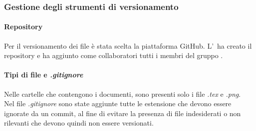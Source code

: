     \subsubsection{Gestione degli strumenti di versionamento}
      \paragraph{Repository}
        Per il versionamento dei file è stata scelta la piattaforma GitHub\glo. L'\roleAdministrator\ ha creato il repository e ha aggiunto 
        come collaboratori tutti i membri del gruppo \groupName.

      \paragraph{Tipi di file e \textit{.gitignore}}
        Nelle cartelle che contengono i documenti, sono presenti solo i file \textit{.tex} e \textit{.png}.\\
        Nel file \textit{.gitignore} sono state aggiunte tutte le estensione che devono essere ignorate da un commit, al fine di evitare la presenza di file indesiderati 
        o non rilevanti che devono quindi non essere versionati.